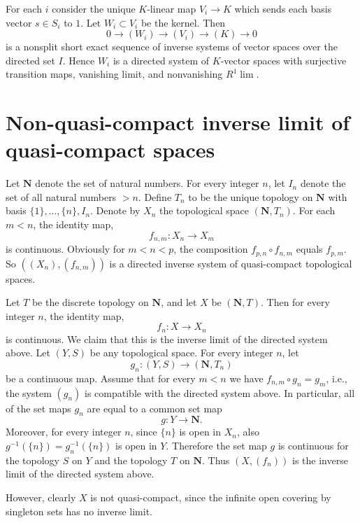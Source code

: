 \medskip\noindent
For each $i$ consider the unique $K$-linear map $V_i \to K$ which sends
each basis vector $s \in S_i$ to $1$. Let $W_i \subset V_i$
be the kernel. Then
$$
0 \to (W_i) \to (V_i) \to (K) \to 0
$$
is a nonsplit short exact sequence of inverse systems of vector spaces
over the directed set $I$. Hence
$W_i$ is a directed system of $K$-vector spaces
with surjective transition maps, vanishing limit, and nonvanishing
$R^1\lim$.



\section{Non-quasi-compact inverse limit of quasi-compact spaces}
\label{section-lim-not-quasi-compact}

\noindent
Let $\mathbf{N}$ denote the set of natural numbers.
For every integer $n$, let $I_n$ denote the set of all natural numbers $> n$.
Define $T_n$ to be the unique topology on $\mathbf{N}$ with basis
$\{1\}, \ldots , \{n\}, I_n$.  Denote by $X_n$ the topological space
$(\mathbf{N}, T_n)$.  For each $m < n$, the identity map,
$$
f_{n, m} : X_n \longrightarrow X_m
$$
is continuous.  Obviously for $m < n < p$, the composition
$f_{p, n} \circ f_{n, m}$ equals $f_{p, m}$.  So $((X_n), (f_{n,m}))$
is a directed inverse system of quasi-compact topological spaces.

\medskip\noindent
Let $T$ be the discrete topology on $\mathbf{N}$, and let $X$ be
$(\mathbf{N}, T)$. Then for every integer $n$, the identity map,
$$
f_n : X \longrightarrow X_n
$$
is continuous. We claim that this is the inverse limit of the directed
system above. Let $(Y, S)$ be any topological space. For every integer $n$,
let
$$
g_n : (Y, S) \longrightarrow (\mathbf{N}, T_n)
$$
be a continuous map. Assume that for every $m < n$ we have
$f_{n,m} \circ g_n = g_m$, i.e., the system $(g_n)$ is compatible
with the directed system above. In particular, all of the set maps
$g_n$ are equal to a common set map
$$
g : Y \longrightarrow \mathbf{N}.
$$
Moreover, for every integer $n$, since $\{n\}$ is open in $X_n$,
also $g^{-1}(\{n\}) = g_n^{-1}(\{n\})$ is open in $Y$.
Therefore the set map $g$ is continuous for the topology $S$ on $Y$
and the topology $T$ on $\mathbf{N}$. Thus $(X, (f_n))$ is the inverse
limit of the directed system above.

\medskip\noindent
However, clearly $X$ is not quasi-compact, since the infinite open
covering by singleton sets has no inverse limit.

